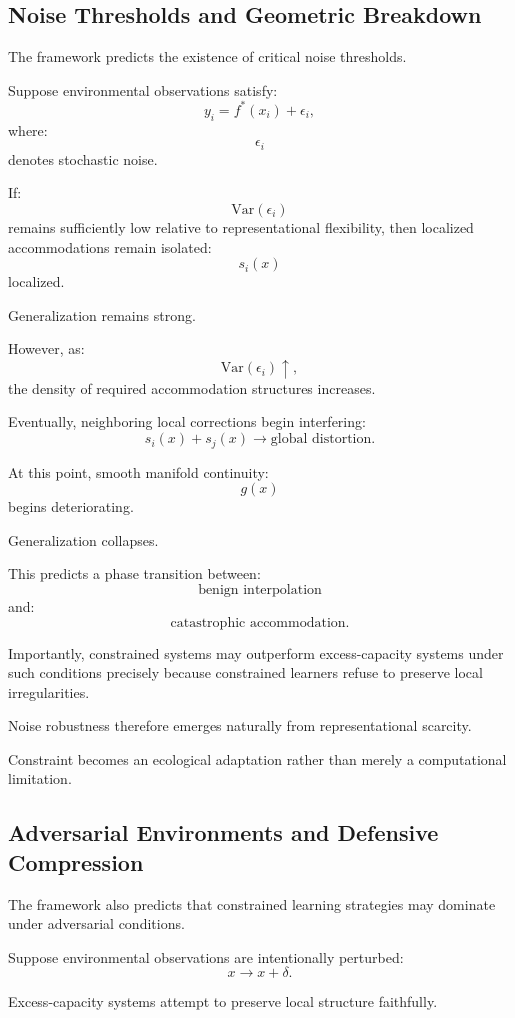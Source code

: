 \documentclass[12pt,a4paper]{article}
\begin{document}
\subsection{Noise Thresholds and Geometric Breakdown}

The framework predicts the existence of critical noise thresholds.

Suppose environmental observations satisfy:
\[
y_i
=
f^\ast(x_i)
+
\epsilon_i,
\]
where:
\[
\epsilon_i
\]
denotes stochastic noise.

If:
\[
\text{Var}(\epsilon_i)
\]
remains sufficiently low relative to representational flexibility, then localized accommodations remain isolated:
\[
s_i(x)
\]
localized.

Generalization remains strong.

However, as:
\[
\text{Var}(\epsilon_i)
\uparrow,
\]
the density of required accommodation structures increases.

Eventually, neighboring local corrections begin interfering:
\[
s_i(x)
+
s_j(x)
\rightarrow
\text{global distortion}.
\]

At this point, smooth manifold continuity:
\[
g(x)
\]
begins deteriorating.

Generalization collapses.

This predicts a phase transition between:
\[
\text{benign interpolation}
\]
and:
\[
\text{catastrophic accommodation}.
\]

Importantly, constrained systems may outperform excess-capacity systems under such conditions precisely because constrained learners refuse to preserve local irregularities.

Noise robustness therefore emerges naturally from representational scarcity.

Constraint becomes an ecological adaptation rather than merely a computational limitation.

\subsection{Adversarial Environments and Defensive Compression}

The framework also predicts that constrained learning strategies may dominate under adversarial conditions.

Suppose environmental observations are intentionally perturbed:
\[
x
\rightarrow
x+\delta.
\]

Excess-capacity systems attempt to preserve local structure faithfully.
\end{document}
